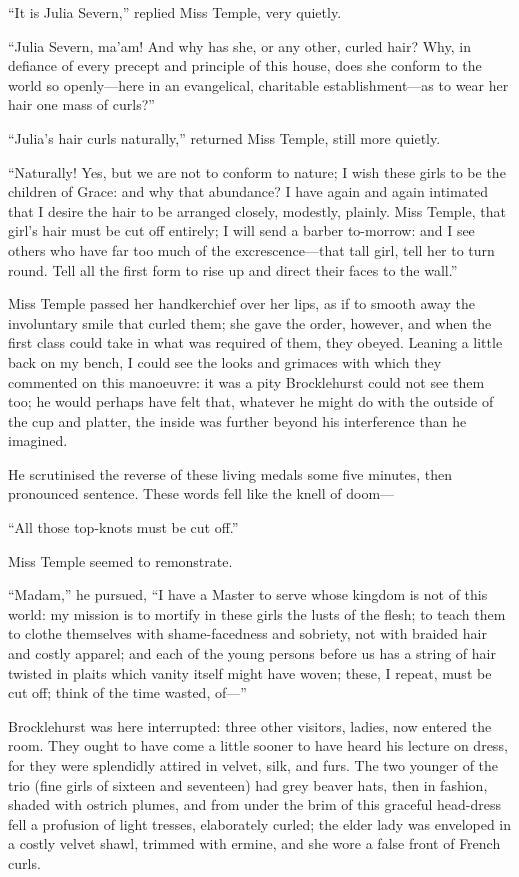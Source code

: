 \enquote{It is Julia Severn,} replied Miss Temple, very quietly.

\enquote{Julia Severn, ma'am! And why has she, or any other, curled
	hair? Why, in defiance of every precept and principle of this house,
	does she conform to the world so openly---here in an evangelical,
	charitable establishment---as to wear her hair one mass of curls?}

\enquote{Julia's hair curls naturally,} returned Miss Temple, still more
quietly.

\enquote{Naturally! Yes, but we are not to conform to nature; I wish
	these girls to be the children of Grace: and why that abundance? I have
	again and again intimated that I desire the hair to be arranged closely,
	modestly, plainly. Miss Temple, that girl's hair must be cut off
	entirely; I will send a barber to-morrow: and I see others who have far
	too much of the excrescence---that tall girl, tell her to turn round.
	Tell all the first form to rise up and direct their faces to the wall.}

Miss Temple passed her handkerchief over her lips, as if to smooth away
the involuntary smile that curled them; she gave the order, however, and
when the first class could take in what was required of them, they
obeyed. Leaning a little back on my bench, I could see the looks and
grimaces with which they commented on this manoeuvre: it was a pity \Mr{}
Brocklehurst could not see them too; he would perhaps have felt that,
whatever he might do with the outside of the cup and platter, the inside
was further beyond his interference than he imagined.

He scrutinised the reverse of these living medals some five minutes,
then pronounced sentence. These words fell like the knell of doom---

\enquote{All those top-knots must be cut off.}

Miss Temple seemed to remonstrate.

\enquote{Madam,} he pursued, \enquote{I have a Master to serve whose
	kingdom is not of this world: my mission is to mortify in these girls
	the lusts of the flesh; to teach them to clothe themselves with
	shame-facedness and sobriety, not with braided hair and costly apparel;
	and each of the young persons before us has a string of hair twisted in
	plaits which vanity itself might have woven; these, I repeat, must be
	cut off; think of the time wasted, of---}

\Mr{} Brocklehurst was here interrupted: three other visitors, ladies, now
entered the room. They ought to have come a little sooner to have heard
his lecture on dress, for they were splendidly attired in velvet, silk,
and furs. The two younger of the trio (fine girls of sixteen and
seventeen) had grey beaver hats, then in fashion, shaded with ostrich
plumes, and from under the brim of this graceful head-dress fell a
profusion of light tresses, elaborately curled; the elder lady was
enveloped in a costly velvet shawl, trimmed with ermine, and she wore a
false front of French curls.

